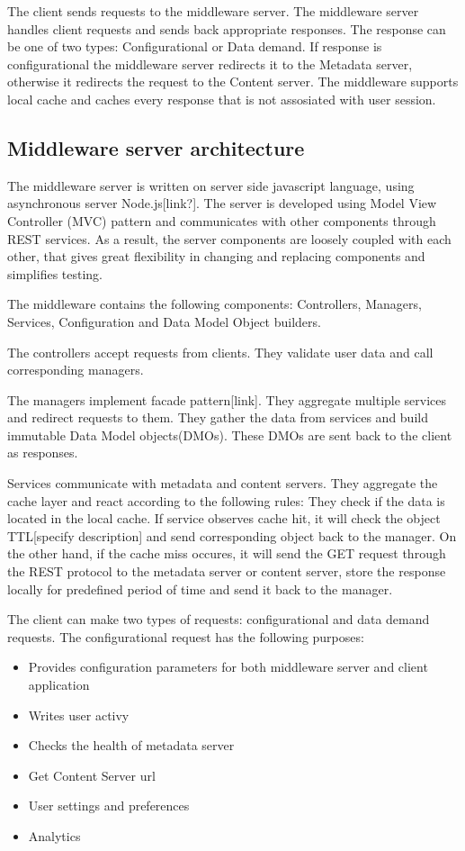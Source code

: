 The client sends requests to the middleware server. The middleware server handles client requests and sends back appropriate responses. The response can be one of two types: Configurational or Data demand. If response is configurational the middleware server redirects it to the Metadata server, otherwise it redirects the request to the Content server. The middleware supports local cache and caches every response that is not assosiated with user session.


\subsection{Middleware server architecture}

The middleware server is written on server side javascript language, using asynchronous server Node.js[link?]. The server is developed using Model View Controller (MVC) pattern and communicates with other components through REST services. As a result, the server components are loosely coupled with each other, that gives great flexibility in changing and replacing components and simplifies testing. 

The middleware contains the following components: Controllers, Managers, Services, Configuration and Data Model Object builders. 

The controllers accept requests from clients. They validate user data and call corresponding managers.

The managers implement facade pattern[link]. They aggregate multiple services and redirect requests to them. They gather the data from services and build immutable Data Model objects(DMOs). These DMOs are sent back to the client as responses.

Services communicate with metadata and content servers. They aggregate the cache layer and react according to the following rules:
They check if the data is located in the local cache. If service observes cache hit, it will check the object TTL[specify description] and send corresponding object back to the manager. On the other hand, if the cache miss occures, it will send the GET request through the REST protocol to the metadata server or content server, store the response locally for predefined period of time and send it back to the manager.

The client can make two types of requests: configurational and data demand requests.
The configurational request has the following purposes:
\begin{itemize}
	\item Provides configuration parameters for both middleware server and client application
	\item Writes user activy
	\item Checks the health of metadata server
	\item Get Content Server url
	\item User settings and preferences
	\item Analytics
\end{itemize}


